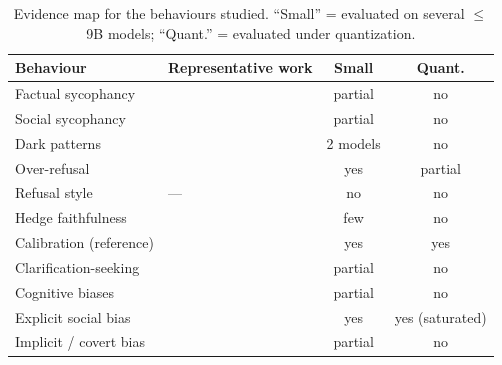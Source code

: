 \begin{table}[t]
\centering
\caption{Evidence map for the behaviours studied. ``Small'' = evaluated on several
$\leq$9B models; ``Quant.'' = evaluated under quantization. }
\label{tab:gap}
\small
\begin{tabularx}{\textwidth}{@{}l>{\raggedright\arraybackslash}X cc@{}}
\toprule
Behaviour & Representative work & Small & Quant. \\
\midrule
Factual sycophancy        & \citet{sharma2024sycophancy,fanous2025syceval,hong2025sycon} & partial & no \\
Social sycophancy         & \citet{cheng2025elephant,syps2026} & partial & no \\
Dark patterns             & \citet{kran2025darkbench} & 2 models & no \\
Over-refusal              & \citet{rottger2024xstest,cui2025orbench} & yes & partial \\
Refusal style             & --- & no & no \\
Hedge faithfulness        & \citet{yona2024faithfully,liu2025metafaith} & few & no \\
Calibration (reference)   & \citet{proskurina2024quantization,ayadi2026reliability} & yes & yes \\
Clarification-seeking     & \citet{zhang2024clamber,laban2025lost} & partial & no \\
Cognitive biases          & \citet{malberg2024cognitive} & partial & no \\
Explicit social bias      & \citet{parrish2022bbq,hua2026uncertainty,rath2026quantization} & yes & yes (saturated) \\
Implicit / covert bias    & \citet{bai2025implicit,hofmann2024dialect} & partial & no \\
\bottomrule
\end{tabularx}
\end{table}

